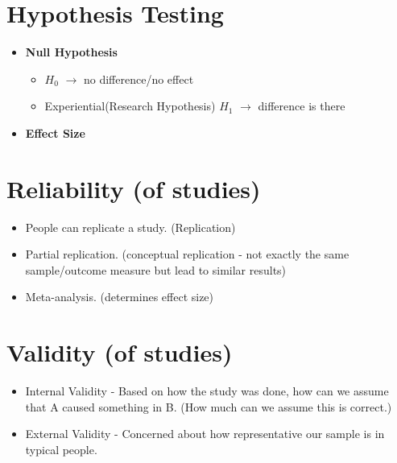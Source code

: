 \documentclass{report}
\begin{document}
\section{Hypothesis Testing}
\begin{itemize}
    \item \textbf{Null Hypothesis}
    \begin{itemize}
        \item $H_0$ $\rightarrow$ no difference/no effect
        \item Experiential(Research Hypothesis) $H_1$ $\rightarrow$ difference is there 
    \end{itemize}
    \item \textbf{Effect Size}
\end{itemize}

\section{Reliability (of studies)}
\begin{itemize}
    \item People can replicate a study. (Replication)
    \item Partial replication. (conceptual replication - not exactly the same sample/outcome measure but lead to similar results)
    \item Meta-analysis. (determines effect size)
\end{itemize}

\section{Validity (of studies)}
\begin{itemize}
    \item Internal Validity - Based on how the study was done, how can we assume that A caused something in B. (How much can we assume this is correct.) 
    \item External Validity - Concerned about how representative our sample is in typical people. 
\end{itemize}

\begin{center}
\end{center}
\end{document}
